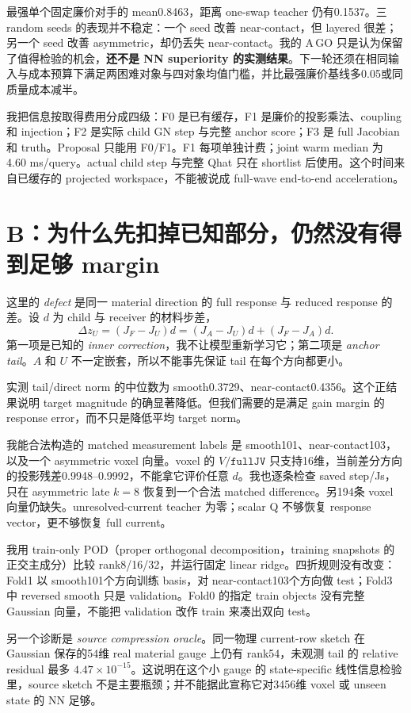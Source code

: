\documentclass[UTF8,11pt,a4paper,fontset=fandol]{ctexart}
\newcommand{\code}[1]{\texttt{#1}}
\begin{document}
最强单个固定廉价对手的 mean0.8463，距离 one-swap teacher 仍有0.1537。三 random seeds 的表现并不稳定：一个 seed 改善 near-contact，但 layered 很差；另一个 seed 改善 asymmetric，却仍丢失 near-contact。我的 A\,GO 只是认为保留了值得检验的机会，\textbf{还不是 NN superiority 的实测结果}。下一轮还须在相同输入与成本预算下满足两困难对象与四对象均值门槛，并比最强廉价基线多0.05或同质量成本减半。

我把信息按取得费用分成四级：F0 是已有缓存，F1 是廉价的投影乘法、coupling 和 injection；F2 是实际 child GN step 与完整 anchor score；F3 是 full Jacobian 和 truth。Proposal 只能用 F0/F1。F1 每项单独计费；joint warm median 为 4.60 ms/query。actual child step 与完整 Qhat 只在 shortlist 后使用。这个时间来自已缓存的 projected workspace，不能被说成 full-wave end-to-end acceleration。

\section{B：为什么先扣掉已知部分，仍然没有得到足够 margin}
这里的 \emph{defect} 是同一 material direction 的 full response 与 reduced response 的差。设 $d$ 为 child 与 receiver 的材料步差，
\[
 \Delta z_U=(J_F-J_U)d=(J_A-J_U)d+(J_F-J_A)d.
\]
第一项是已知的 \emph{inner correction}，我不让模型重新学习它；第二项是 \emph{anchor tail}。$A$ 和 $U$ 不一定嵌套，所以不能事先保证 tail 在每个方向都更小。

实测 tail/direct norm 的中位数为 smooth0.3729、near-contact0.4356。这个正结果说明 target magnitude 的确显著降低。但我们需要的是满足 gain margin 的 response error，而不只是降低平均 target norm。

我能合法构造的 matched measurement labels 是 smooth101、near-contact103，以及一个 asymmetric voxel 向量。voxel 的 $V/\code{fullJV}$ 只支持16维，当前差分方向的投影残差0.9948--0.9992，不能拿它评价任意 $d$。我也逐条检查 saved step/Js，只在 asymmetric late $k=8$ 恢复到一个合法 matched difference。另194条 voxel 向量仍缺失。unresolved-current teacher 为零；scalar Q 不够恢复 response vector，更不够恢复 full current。

我用 train-only POD（proper orthogonal decomposition，training snapshots 的正交主成分）比较 rank8/16/32，并运行固定 linear ridge。四折规则没有改变：Fold1 以 smooth101个方向训练 basis，对 near-contact103个方向做 test；Fold3 中 reversed smooth 只是 validation。Fold0 的指定 train objects 没有完整 Gaussian 向量，不能把 validation 改作 train 来凑出双向 test。

另一个诊断是 \emph{source compression oracle}。同一物理 current-row sketch 在 Gaussian 保存的54维 real material gauge 上仍有 rank54，未观测 tail 的 relative residual 最多 $4.47\times10^{-15}$。这说明在这个小 gauge 的 state-specific 线性信息检验里，source sketch 不是主要瓶颈；并不能据此宣称它对3456维 voxel 或 unseen state 的 NN 足够。
\end{document}
